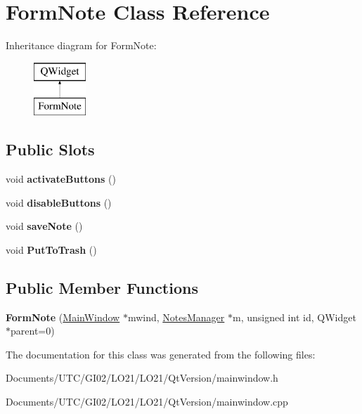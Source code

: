 \hypertarget{class_form_note}{}\section{Form\+Note Class Reference}
\label{class_form_note}
Inheritance diagram for Form\+Note\+:\begin{figure}[H]
\begin{center}
\leavevmode
\includegraphics[height=2.000000cm]{class_form_note}
\end{center}
\end{figure}
\subsection*{Public Slots}
\begin{DoxyCompactItemize}
\item 
\mbox{\label{class_form_note_a6e4ade87e298737a37407194519f6bdd}} 
void {\bfseries activate\+Buttons} ()
\item 
\mbox{\label{class_form_note_a989367d8a01755c740252a5f08610cb6}} 
void {\bfseries disable\+Buttons} ()
\item 
\mbox{\label{class_form_note_a052d71f4e7c3cae5cb8fa8979a2214c0}} 
void {\bfseries save\+Note} ()
\item 
\mbox{\label{class_form_note_a1a8becf0976ab645b89546851da17dff}} 
void {\bfseries Put\+To\+Trash} ()
\end{DoxyCompactItemize}
\subsection*{Public Member Functions}
\begin{DoxyCompactItemize}
\item 
\mbox{\label{class_form_note_aeaa8060643121e5567cb140990e5cbd0}} 
{\bfseries Form\+Note} (\hyperlink{class_main_window}{Main\+Window} $\ast$mwind, \hyperlink{class_notes_manager}{Notes\+Manager} $\ast$m, unsigned int id, Q\+Widget $\ast$parent=0)
\end{DoxyCompactItemize}


The documentation for this class was generated from the following files\+:\begin{DoxyCompactItemize}
\item 
Documents/\+U\+T\+C/\+G\+I02/\+L\+O21/\+L\+O21/\+Qt\+Version/mainwindow.\+h\item 
Documents/\+U\+T\+C/\+G\+I02/\+L\+O21/\+L\+O21/\+Qt\+Version/mainwindow.\+cpp\end{DoxyCompactItemize}
